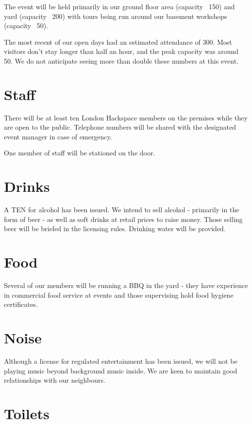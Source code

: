 The event will be held primarily in our ground floor area (capacity ~150) and yard
(capacity ~200) with tours being run around our basement workshops (capacity ~50).

The most recent of our open days had an estimated attendance of 300. Most visitors
don't stay longer than half an hour, and the peak capacity was around 50. We do not
anticipate seeing more than double these numbers at this event.

\section{Staff}

There will be at least ten London Hackspace members on the premises while they are
open to the public. Telephone numbers will be shared with the designated event
manager in case of emergency.

One member of staff will be stationed on the door.

\section{Drinks}

A TEN for alcohol has been issued. We intend to sell alcohol - primarily in the form
of beer - as well as soft drinks at retail prices to raise money. Those selling beer
will be briefed in the licensing rules. Drinking water will be provided.

\section{Food}

Several of our members will be running a BBQ in the yard - they have experience in
commercial food service at events and those supervising hold food hygiene certificates.

\section{Noise}

Although a license for regulated entertainment has been issued, we will not be
playing music beyond background music inside. We are keen to maintain good
relationships with our neighbours.

\section{Toilets}

